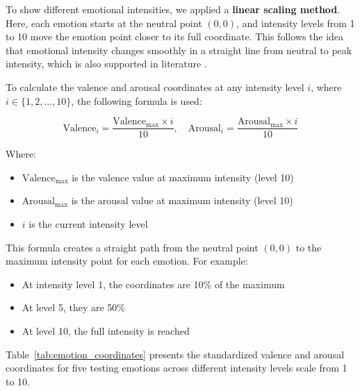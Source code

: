To show different emotional intensities, we applied a \textbf{linear scaling method}. Here, each emotion starts at the neutral point $(0,0)$, and intensity levels from 1 to 10 move the emotion point closer to its full coordinate. This follows the idea that emotional intensity changes smoothly in a straight line from neutral to peak intensity, which is also supported in literature \cite{posner2005circumplex}.

To calculate the valence and arousal coordinates at any intensity level \( i \), where \( i \in \{1, 2, ..., 10\} \), the following formula is used:

\begin{equation}
\text{Valence}_{i} = \frac{\text{Valence}_{\text{max}} \times i}{10}, \quad
\text{Arousal}_{i} = \frac{\text{Arousal}_{\text{max}} \times i}{10}
\end{equation}

Where:

\begin{itemize}
    \item \( \text{Valence}_{\text{max}} \) is the valence value at maximum intensity (level 10)
    \item \( \text{Arousal}_{\text{max}} \) is the arousal value at maximum intensity (level 10)
    \item \( i \) is the current intensity level
\end{itemize}

This formula creates a straight path from the neutral point \((0,0)\) to the maximum intensity point for each emotion. For example:

\begin{itemize}
    \item At intensity level 1, the coordinates are 10\% of the maximum
    \item At level 5, they are 50\%
    \item At level 10, the full intensity is reached
\end{itemize}


Table~\ref{tab:emotion_coordinates} presents the standardized valence and arousal coordinates for five testing emotions across different intensity levels scale from 1 to 10. 

